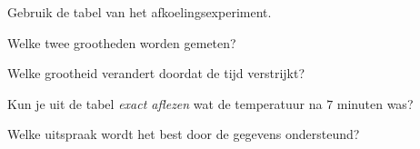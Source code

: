\documentclass{ximera}
\begin{document}

\begin{oefening}{\oefB \ESS}

Gebruik de tabel van het afkoelingsexperiment.

\begin{question}
Welke twee grootheden worden gemeten?

\begin{multipleChoice}
\end{multipleChoice}
\end{question}

\begin{question}
Welke grootheid verandert doordat de tijd verstrijkt?

\begin{multipleChoice}
\end{multipleChoice}
\end{question}

\begin{question}
Kun je uit de tabel \emph{exact aflezen} wat de temperatuur na
$7$ minuten was?

\begin{multipleChoice}
\end{multipleChoice}
\end{question}

\begin{question}
Welke uitspraak wordt het best door de gegevens ondersteund?

\begin{multipleChoice}
\end{multipleChoice}
\end{question}

\end{oefening}


\end{document}
